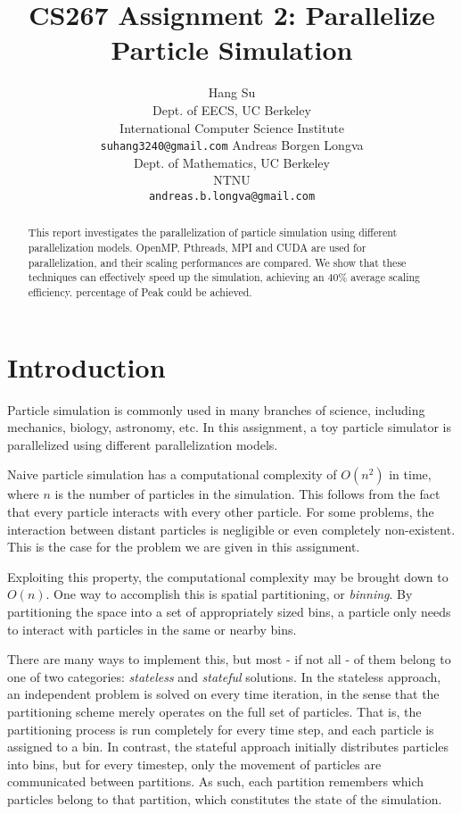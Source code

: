 \documentclass[11pt]{article}
\title{CS267 Assignment 2: Parallelize Particle Simulation}
\author{Hang Su \\
  Dept. of EECS, UC Berkeley \\
  International Computer Science Institute \\
  {\tt suhang3240@gmail.com}
  \And
  Andreas Borgen Longva \\
  Dept. of Mathematics, UC Berkeley \\
  NTNU \\
  {\tt andreas.b.longva@gmail.com}
}
\date{}
\begin{document}
\maketitle
\vspace{-8mm}
\begin{abstract}
This report investigates the parallelization of particle simulation using different parallelization models.
OpenMP, Pthreads, MPI and CUDA are used for parallelization, and their scaling performances are compared.
We show that these techniques can effectively speed up the simulation, achieving an 40\% average scaling efficiency.
percentage of Peak could be achieved.
\end{abstract}

\section{Introduction}
Particle simulation is commonly used in many branches of science, including mechanics, biology, astronomy, etc. In this assignment, a toy particle simulator is parallelized using different parallelization models.

Naive particle simulation has a computational complexity of $O(n^2)$ in time, where $n$ is the number of particles in the simulation. This follows from the fact that every particle interacts with every other particle. For some problems, the interaction between distant particles is negligible or even completely non-existent. This is the case for the problem we are given in this assignment.

Exploiting this property, the computational complexity may be brought down to $O(n)$. One way to accomplish this is spatial partitioning, or \emph{binning}. By partitioning the space into a set of appropriately sized bins, a particle only needs to interact with particles in the same or nearby bins.

There are many ways to implement this, but most - if not all - of them belong to one of two categories: \emph{stateless} and \emph{stateful} solutions. In the stateless approach, an independent problem is solved on every time iteration, in the sense that the partitioning scheme merely operates on the full set of particles. That is, the partitioning process is run completely for every time step, and each particle is assigned to a bin. In contrast, the stateful approach initially distributes particles into bins, but for every timestep, only the movement of particles are communicated between partitions. As such, each partition remembers which particles belong to that partition, which constitutes the state of the simulation.
\end{document}
